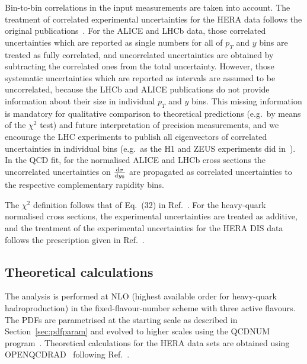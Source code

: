 \documentclass[12pt]{article}
\begin{document}
Bin-to-bin correlations in the input measurements are taken into account.
The treatment of correlated experimental uncertainties for the HERA data follows the original publications~\cite{Abramowicz:2015mha,H1:2018flt}.
For the ALICE and LHCb data, those correlated uncertainties which are reported as single numbers for all of $p_T$ and $y$ bins are treated as fully correlated, and uncorrelated uncertainties are obtained by subtracting the correlated ones from the total uncertainty. 
However, those systematic uncertainties which are reported as intervals are assumed to be uncorrelated, because the LHCb and ALICE publications do not provide information about their size in individual $p_T$ and $y$ bins. 
This missing information is mandatory for qualitative comparison to theoretical predictions (e.g.\ by means of the $\chi^2$ test) and future interpretation of precision measurements, and we encourage the LHC experiments to publish all eigenvectors of correlated uncertainties in individual bins (e.g.\ as the H1 and ZEUS experiments did in~\cite{Abramowicz:2015mha,H1:2018flt}).
In the QCD fit, for the normalised ALICE and LHCb cross sections the uncorrelated uncertainties on $\frac{{\rm d}\sigma}{{\rm d}y_0}$ are propagated as correlated uncertainties to the respective complementary rapidity bins. 

The $\chi^2$ definition follows that of Eq.~(32) in Ref.~\cite{Abramowicz:2015mha}.
For the heavy-quark normalised cross sections, the experimental uncertainties are treated as additive, and the treatment of the experimental uncertainties for the HERA DIS data follows the prescription given in Ref.~\cite{Abramowicz:2015mha}.

\subsection{Theoretical calculations}
\label{sec:th}

The analysis is performed at NLO (highest available order for heavy-quark hadroproduction) in the fixed-flavour-number scheme with three active flavours.
The PDFs are parametrised at the starting scale as described in Section~\ref{sec:pdfparam} and evolved to higher scales using the QCDNUM program~\cite{Botje:2010ay}.
Theoretical calculations for the HERA data sets are obtained using OPENQCDRAD~\cite{openqcdrad} following Ref.~\cite{H1:2018flt}.
\end{document}
